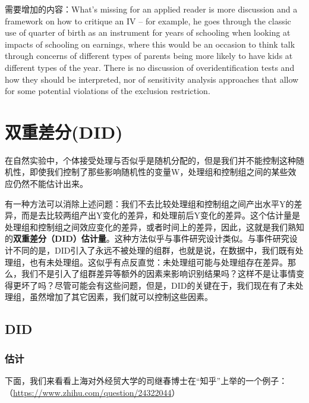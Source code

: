\documentclass[cn,12pt,math=newtx,citestyle=gb7714-2015,bibstyle=gb7714-2015]{elegantbook}
\begin{document}
	
需要增加的内容：What’s missing for an applied reader is more discussion and a framework on how to critique an IV – for example, he goes through the classic use of quarter of birth as an instrument for years of schooling when looking at impacts of schooling on earnings, where this would be an occasion to think talk through concerns of different types of parents being more likely to have kids at different types of the year. There is no discussion of overidentification tests and how they should be interpreted, nor of sensitivity analysis approaches that allow for some potential violations of the exclusion restriction.
	
	
	

	
	
	
	
	
	\chapter{双重差分(DID)}
	
	在自然实验中，个体接受处理与否似乎是随机分配的，但是我们并不能控制这种随机性，即使我们控制了那些影响随机性的变量W，处理组和控制组之间的某些效应仍然不能估计出来。
	
	有一种方法可以消除上述问题：我们不去比较处理组和控制组之间产出水平Y的差异，而是去比较两组产出Y变化的差异，和处理前后Y变化的差异。这个估计量是处理组和控制组之间效应变化的差异，或者时间上的差异，因此，这就是我们熟知的\textbf{双重差分（DID）估计量}。这种方法似乎与事件研究设计类似。与事件研究设计不同的是，DID引入了永远不被处理的组群，也就是说，在数据中，我们既有处理组，也有未处理组。这似乎有点反直觉：未处理组可能与处理组存在差异。那么，我们不是引入了组群差异等额外的因素来影响识别结果吗？这样不是让事情变得更坏了吗？尽管可能会有这些问题，但是，DID的关键在于，我们现在有了未处理组，虽然增加了其它因素，我们就可以控制这些因素。
	
	\section{DID}
	\subsection{估计}
	
	下面，我们来看看上海对外经贸大学的司继春博士在“知乎”上举的一个例子：（\url{https://www.zhihu.com/question/24322044}）
	
\end{document}
